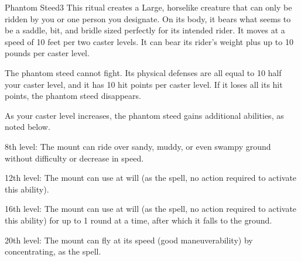 \begin{spellsection}{Phantom Steed}{3}
\spellrng{\rngclose}
\spelldur \durext \dismissable
{}
\spellline
\spelleffect This ritual creates a Large, horselike creature that can only be ridden by you or one person you designate. On its body, it bears what seems to be a saddle, bit, and bridle sized perfectly for its intended rider. 
It moves at a speed of 10 feet per two caster levels. It can bear its rider's weight plus up to 10 pounds per caster level.

The phantom steed cannot fight. Its physical defenses are all equal to 10 \add half your caster level, and it has 10 hit points  per caster level. If it loses all its hit points, the phantom steed disappears.

\par As your caster level increases, the phantom steed gains additional abilities, as noted below.

\par 8th level: The mount can ride over sandy, muddy, or even swampy ground without difficulty or decrease in speed.

\par 12th level: The mount can use  at will (as the spell, no action required to activate this ability).

\par 16th level: The mount can use  at will (as the spell, no action required to activate this ability) for up to 1 round at a time, after which it falls to the ground.

\par 20th level: The mount can fly at its speed (good maneuverability) by concentrating, as the  spell.
\end{spellsection}

